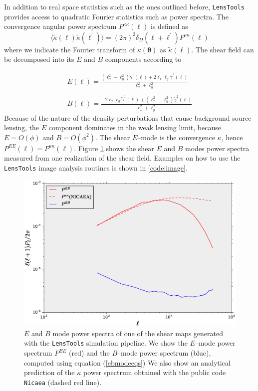 \documentclass[5p]{elsarticle}
\newcommand{\ttt}[1]{\texttt{#1}}
\newcommand{\LT}{\texttt{LensTools} }
\begin{document}
%
In addition to real space statistics such as the ones outlined before, \LT provides access to quadratic Fourier statistics such as power spectra. The convergence angular power spectrum $P^{\kappa\kappa}(\ell)$ is defined as  
\begin{equation}
\label{kappapsdefinition}
\langle\tilde{\kappa}(\pmb{\ell})\tilde{\kappa}(\pmb{\ell}^\prime)\rangle = (2\pi)^2\delta_D(\pmb{\ell}+\pmb{\ell}^\prime)P^{\kappa\kappa}(\ell)
\end{equation}
%
where we indicate the Fourier transform of $\kappa(\pmb{\theta})$ as $\tilde{\kappa}(\pmb{\ell})$. The shear field can be decomposed into its $E$ and $B$ components according to 

\begin{equation}
\label{ebmodeeqs}
\begin{matrix}
E(\pmb{\ell}) = \frac{(\ell_x^2-\ell_y^2)\tilde{\gamma}^1(\pmb{\ell})+2\ell_x\ell_y\tilde{\gamma}^2(\pmb{\ell})}{\ell_x^2+\ell_y^2}  \\ \\
B(\pmb{\ell}) = \frac{-2\ell_x\ell_y\tilde{\gamma}^1(\pmb{\ell})+(\ell_x^2-\ell_y^2)\tilde{\gamma}^2(\pmb{\ell})}{\ell_x^2+\ell_y^2}
\end{matrix}
\end{equation}
%
Because of the nature of the density perturbations that cause background source lensing, the $E$ component dominates in the weak lensing limit, because $E=O(\phi)$ and $B=O(\phi^2)$. The shear $E$--mode is the convergence $\kappa$, hence $P^{EE}(\ell)=P^{\kappa\kappa}(\ell)$. Figure \ref{ebmodefig} shows the shear $E$ and $B$ modes power spectra measured from one realization of the shear field. Examples on how to use the \LT image analysis routines is shown in \ref{code:image}.   

\begin{figure}
\includegraphics[scale=0.3]{Figures/eb_modes.eps}
\caption{$E$ and $B$ mode power spectra of one of the shear maps generated with the \LT simulation pipeline. We show the $E$--mode power spectrum $P^{EE}$ (red) and the $B$--mode power spectrum (blue), computed using equation (\ref{ebmodeeqs}) We also show an analytical prediction of the $\kappa$ power spectrum obtained with the public code \ttt{Nicaea} (dashed red line).}
\label{ebmodefig}
\end{figure}
\end{document}
